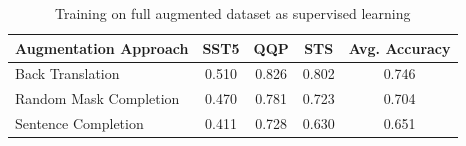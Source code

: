 \documentclass{article}
\begin{document}
\begin{table}[htbp]
  \centering
  \caption{Training on full augmented dataset as supervised learning}
  \label{tab:data_aug_comp}
  \begin{tabular}{@{}lcccc@{}}
  \toprule
  \textbf{Augmentation Approach} & \textbf{SST5} & \textbf{QQP} & \textbf{STS} & \textbf{Avg. Accuracy} \\ \midrule
  Back Translation               & 0.510         & 0.826        & 0.802        & 0.746                  \\
  Random Mask Completion         & 0.470         & 0.781        & 0.723        & 0.704                  \\
  Sentence Completion            & 0.411         & 0.728        & 0.630        & 0.651                  \\ \bottomrule
  \end{tabular}
\end{table}
\end{document}
